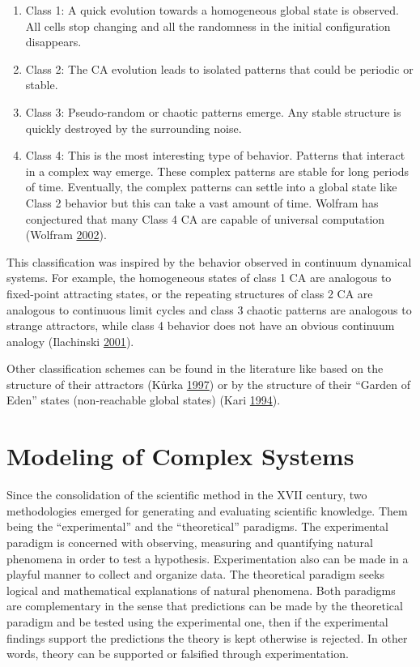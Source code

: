 \documentclass[
  12pt,
  openany]{book}
\begin{document}
\begin{enumerate}
\def\labelenumi{\arabic{enumi}.}
\item
  Class 1: A quick evolution towards a homogeneous global state is observed. All cells stop changing and all the randomness in the initial configuration disappears.
\item
  Class 2: The CA evolution leads to isolated patterns that could be periodic or stable.
\item
  Class 3: Pseudo-random or chaotic patterns emerge. Any stable structure is quickly destroyed by the surrounding noise.
\item
  Class 4: This is the most interesting type of behavior. Patterns that interact in a complex way emerge. These complex patterns are stable for long periods of time. Eventually, the complex patterns can settle into a global state like Class 2 behavior but this can take a vast amount of time. Wolfram has conjectured that many Class 4
  CA are capable of universal computation (Wolfram \protect\hyperlink{ref-wolfram2002new}{2002}).
\end{enumerate}

This classification was inspired by the behavior observed in continuum dynamical systems. For example, the homogeneous states of class 1 CA are analogous to fixed-point attracting states, or the repeating structures of class 2 CA are analogous to continuous limit cycles and class 3 chaotic patterns are analogous to strange attractors, while class 4 behavior does not have an obvious continuum analogy (Ilachinski \protect\hyperlink{ref-ilachinski2001cellular}{2001}).

Other classification schemes can be found in the literature like based on the structure of their attractors (Kůrka \protect\hyperlink{ref-kuurka1997languages}{1997}) or by the structure of their ``Garden of Eden'' states (non-reachable global states) (Kari \protect\hyperlink{ref-kari1994reversibility}{1994}).

\hypertarget{modeling-of-complex-systems}{%
\section{Modeling of Complex Systems}\label{modeling-of-complex-systems}}

Since the consolidation of the scientific method in the XVII century, two methodologies emerged for generating and evaluating scientific knowledge. Them being the ``experimental'' and the ``theoretical'' paradigms. The experimental paradigm is concerned with observing, measuring and quantifying natural phenomena in order to test a hypothesis. Experimentation also can be made in a playful manner to collect and organize data. The theoretical paradigm seeks logical and mathematical explanations of natural phenomena. Both paradigms are complementary in the sense that predictions can be made by the theoretical paradigm and be tested using the experimental one, then if the experimental findings support the predictions the theory is kept otherwise is rejected. In other words, theory can be supported or falsified through experimentation.
\end{document}
